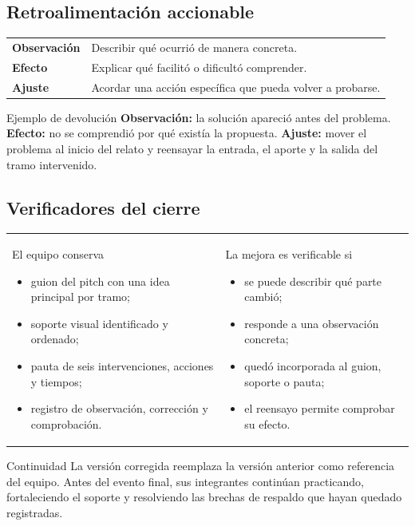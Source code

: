 \documentclass[10pt,a4paper]{article}
\begin{document}
\subsection{Retroalimentación accionable}
\begin{tabularx}{\textwidth}{@{}p{36mm}Y@{}}
\textbf{Observación} & Describir qué ocurrió de manera concreta. \\
\textbf{Efecto} & Explicar qué facilitó o dificultó comprender. \\
\textbf{Ajuste} & Acordar una acción específica que pueda volver a probarse. \\
\end{tabularx}

\begin{accentbox}{Ejemplo de devolución}
\textbf{Observación:} la solución apareció antes del problema. \textbf{Efecto:} no se comprendió por qué existía la propuesta. \textbf{Ajuste:} mover el problema al inicio del relato y reensayar la entrada, el aporte y la salida del tramo intervenido.
\end{accentbox}

\subsection{Verificadores del cierre}
\begin{tabularx}{\textwidth}{@{}Y@{\hspace{5mm}}Y@{}}
\begin{docbox}[height=59mm]{El equipo conserva}
\begin{itemize}
  \item guion del pitch con una idea principal por tramo;
  \item soporte visual identificado y ordenado;
  \item pauta de seis intervenciones, acciones y tiempos;
  \item registro de observación, corrección y comprobación.
\end{itemize}
\end{docbox}
&
\begin{docbox}[height=59mm]{La mejora es verificable si}
\begin{itemize}
  \item se puede describir qué parte cambió;
  \item responde a una observación concreta;
  \item quedó incorporada al guion, soporte o pauta;
  \item el reensayo permite comprobar su efecto.
\end{itemize}
\end{docbox}
\end{tabularx}

\begin{navybox}{Continuidad}
La versión corregida reemplaza la versión anterior como referencia del equipo. Antes del evento final, sus integrantes continúan practicando, fortaleciendo el soporte y resolviendo las brechas de respaldo que hayan quedado registradas.
\end{navybox}
\end{document}
